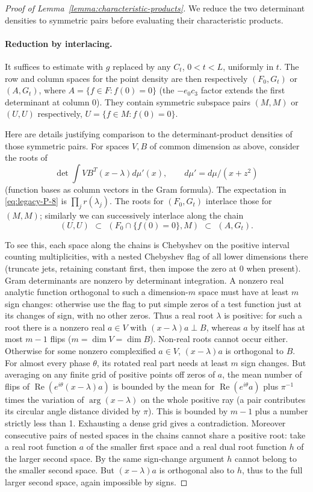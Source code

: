 \begin{proof}[Proof of Lemma~\ref{lemma:characteristic-products}]
We reduce the two determinant densities to symmetric pairs before evaluating their characteristic products.
\paragraph{Reduction by interlacing.}
It suffices to estimate with $g$ replaced by any $C_t$, $0<t<L$, uniformly in $t$. The row and column spaces for the point density are then respectively $(F_0,G_t)$ or $(A,G_t)$, where $A=\{f\in F:f(0)=0\}$ (the $-e_0 c_3$ factor extends the first determinant at column 0). They contain symmetric subspace pairs $(M,M)$ or $(U,U)$ respectively, $U=\{f\in M:f(0)=0\}$.

Here are details justifying comparison to the determinant-product densities of those symmetric pairs. For spaces $V,B$ of common dimension as above, consider the roots of
\[
 \det \int V B^T(x-\lambda)d\mu'(x),\qquad d\mu'=d\mu/(x+z^2)
\]
(function bases as column vectors in the Gram formula). The expectation in \eqref{eq:legacy-P-8} is $\prod_j r(\lambda_j)$. The roots for $(F_0,G_t)$ interlace those for $(M,M)$; similarly we can successively interlace along the chain
\[
 (U,U)\ \,\subset\ \, (F_0\cap\{f(0)=0\},M)\ \,\subset\ \, (A,G_t).
\]

To see this, each space along the chains is Chebyshev on the positive interval counting multiplicities, with a nested Chebyshev flag of all lower dimensions there (truncate jets, retaining constant first, then impose the zero at 0 when present). Gram determinants are nonzero by determinant integration. A nonzero real analytic function orthogonal to such a dimension-$m$ space must have at least $m$ sign changes: otherwise use the flag to put simple zeros of a test function just at its changes of sign, with no other zeros. Thus a real root $\lambda$ is positive: for such a root there is a nonzero real $a\in V$ with $(x-\lambda)a\perp B$, whereas $a$ by itself has at most $m-1$ flips ($m=\dim V=\dim B$). Non-real roots cannot occur either. Otherwise for some nonzero complexified $a\in V$, $(x-\lambda)a$ is orthogonal to $B$. For almost every phase $\theta$, its rotated real part needs at least $m$ sign changes. But averaging on any finite grid of positive points off zeros of $a$, the mean number of flips of $\operatorname{Re}(e^{i\theta}(x-\lambda)a)$ is bounded by the mean for $\operatorname{Re}(e^{i\theta}a)$ plus $\pi^{-1}$ times the variation of $\arg(x-\lambda)$ on the whole positive ray (a pair contributes its circular angle distance divided by $\pi$). This is bounded by $m-1$ plus a number strictly less than 1. Exhausting a dense grid gives a contradiction. Moreover consecutive pairs of nested spaces in the chains cannot share a positive root: take a real root function $a$ of the smaller first space and a real dual root function $h$ of the larger second space. By the same sign-change argument $h$ cannot belong to the smaller second space. But $(x-\lambda)a$ is orthogonal also to $h$, thus to the full larger second space, again impossible by signs.


\end{proof}
